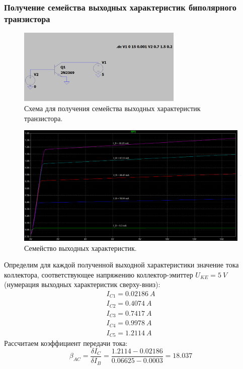 \documentclass[12pt]{article}
\begin{document}
\subsubsection*{Получение семейства выходных характеристик биполярного транзистора}
\begin{figure}[H]
    \centering
    \includegraphics[width=0.7\textwidth]{2_scheme.png}
    \caption{Схема для получения семейства выходных характеристик транзистора.}
    \label{fig:2_scheme.png}
\end{figure}
\begin{figure}[H]
    \centering
    \includegraphics[width=\textwidth]{2_output_char.png}
    \caption{Семейство выходных характеристик.}
    \label{fig:2_output_char.png}
\end{figure}
Определим для каждой полученной выходной характеристики значение тока коллектора, соответствующее напряжению коллектор-эмиттер $U_{KE} = 5 \ V$ (нумерация выходных характеристик сверху-вниз):
\begin{align*} 
I_{C1} = 0.02186 \ A \\ 
I_{C2} = 0.4074 \ A \\
I_{C3} = 0.7417 \ A \\
I_{C4} = 0.9978 \ A \\
I_{C5} = 1.2114 \ A
\end{align*}
Рассчитаем коэффициент передачи тока:
\[
\beta_{AC} = \frac{\delta I_C}{\delta I_B} = \frac{1.2114 - 0.02186}{0.06625 - 0.0003} = 18.037
\]
\end{document}
